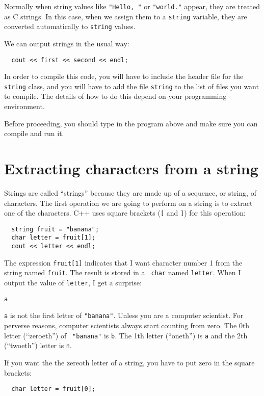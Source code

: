 Normally when string values like {\tt "Hello, "} or {\tt "world."}
appear, they are treated as C strings.  In this case, when we assign
them to a {\tt string} variable, they are converted automatically
to {\tt string} values.

We can output strings in the usual way:

\begin{verbatim}
  cout << first << second << endl;
\end{verbatim}
%

In order to compile this code, you will have to include the
header file for the {\tt string} class, and you will have
to add the file {\tt string} to the list of files you
want to compile.  The details of how to do this depend on your
programming environment.

Before proceeding, you should type in the program above and make
sure you can compile and run it.

\section{Extracting characters from a string}

Strings are called ``strings'' because they are made up of a sequence,
or string, of characters.  The first operation we are going to
perform on a string is to extract one of the characters.  C++
uses square brackets ({\tt [} and {\tt ]}) for this operation:

\begin{verbatim}
  string fruit = "banana";
  char letter = fruit[1];
  cout << letter << endl;
\end{verbatim}
%
The expression {\tt fruit[1]} indicates that I want character number 1
from the string named {\tt fruit}.  The result is stored in a {\tt
char} named {\tt letter}.  When I output the value of {\tt letter}, I
get a surprise:

\begin{verbatim}
a
\end{verbatim}
%
{\tt a} is not the first letter of {\tt "banana"}.  Unless you are a
computer scientist.  For perverse reasons, computer scientists always
start counting from zero.  The 0th letter (``zeroeth'') of {\tt
"banana"} is {\tt b}.  The 1th letter (``oneth'') is {\tt a} and the
2th (``twoeth'') letter is {\tt n}.

If you want the the zereoth letter of a string, you have to put
zero in the square brackets:

\begin{verbatim}
  char letter = fruit[0];
\end{verbatim}

